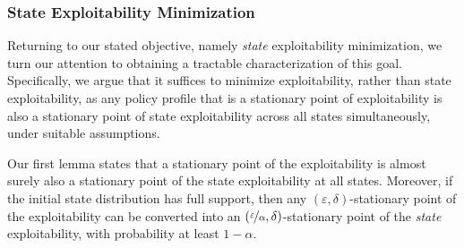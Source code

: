 \subsubsection{State Exploitability Minimization}
\label{sec:mismatch}

Returning to our stated objective, namely \emph{state\/} exploitability minimization, we turn our attention to obtaining a tractable characterization of this goal.
Specifically, we argue that it suffices to minimize exploitability, rather than state exploitability, as any policy profile that is a stationary point of exploitability is also a stationary point of state exploitability across all states simultaneously, under suitable assumptions.

Our first lemma states that a stationary point of the exploitability is almost surely also a stationary point of the state exploitability at all states.
Moreover, if the initial state distribution has full support, then any $(\varepsilon, \delta)$-stationary point of the exploitability can be converted into an $(\nicefrac{\varepsilon}{\alpha}, \delta)$-stationary point of the \emph{state\/} exploitability, with probability at least $1-\alpha$.



